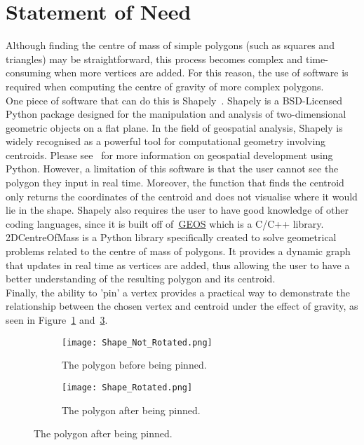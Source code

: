 \documentclass{article}
\begin{document}
\section{Statement of Need}
Although finding the centre of mass of simple polygons (such as squares and triangles) may be straightforward, this process becomes complex and time-consuming when more vertices are added. For this reason, the use of software is required when computing the centre of gravity of more complex polygons.\\
One piece of software that can do this is Shapely~\cite{ShapelyDocumentation2-0-4}. Shapely is a BSD-Licensed Python package designed for the manipulation and analysis of two-dimensional geometric objects on a flat plane. In the field of geospatial analysis, Shapely is widely recognised as a powerful tool for computational geometry involving centroids. Please see~\cite{westra2010python} for more information on geospatial development using Python. However, a limitation of this software is that the user cannot see the polygon they input in real time. Moreover, the function that finds the centroid only returns the coordinates of the centroid and does not visualise where it would lie in the shape. Shapely also requires the user to have good knowledge of other coding languages, since it is built off of~\href{https://libgeos.org/}{GEOS} which is a C/C++ library. \\
2DCentreOfMass is a Python library specifically created to solve geometrical problems related to the centre of mass of polygons. It provides a dynamic graph that updates in real time as vertices are added, thus allowing the user to have a better understanding of the resulting polygon and its centroid.\\
Finally, the ability to 'pin' a vertex provides a practical way to demonstrate the relationship between the chosen vertex and centroid under the effect of gravity, as seen in Figure~\ref{shape_not_rotated} and~\ref{shape_rotated}.

\begin{figure}
\centering
\begin{subfigure}{.5\textwidth}
    \centering
    \texttt{[image: Shape\_Not\_Rotated.png]}
    \caption{The polygon before being pinned.}
    \label{shape_not_rotated}
\end{subfigure}%
\begin{subfigure}{.5\textwidth}
    \centering
    \texttt{[image: Shape\_Rotated.png]}
    \caption{The polygon after being pinned.}
    \label{shape_rotated}
\end{subfigure}
\end{figure}
\end{document}
